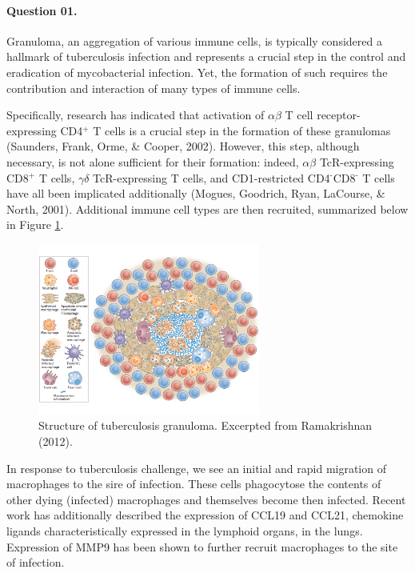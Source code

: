 \documentclass[11pt,letterpaper,final] {article}
\newcommand{\super}[1]{\ensuremath{^{\text{#1}}}}
\begin{document}

\paragraph{Question 01.} Granuloma, an aggregation of various immune cells, is typically considered a hallmark of tuberculosis infection and represents a crucial step in the control and eradication of mycobacterial infection. Yet, the formation of such requires the contribution and interaction of many types of immune cells.

Specifically, research has indicated that activation of $\alpha\beta$ T cell receptor-expressing CD4\super{+} T cells is a crucial step in the formation of these granulomas (Saunders, Frank, Orme, \& Cooper, 2002). However, this step, although necessary, is not alone sufficient for their formation: indeed, $\alpha\beta$ TcR-expressing CD8\super{+} T cells, $\gamma\delta$ TcR-expressing T cells, and CD1-restricted CD4\super{-}CD8\super{-} T cells have all been implicated additionally (Mogues, Goodrich, Ryan, LaCourse, \& North, 2001). Additional immune cell types are then recruited, summarized below in Figure \ref{fig:00}.

\begin{figure}[htp]
  \centering
    \includegraphics[width=0.65\textwidth]{granuloma}
	\caption{Structure of tuberculosis granuloma. Excerpted from Ramakrishnan (2012).}
	\label{fig:00}
\end{figure}

In response to tuberculosis challenge, we see an initial and rapid migration of macrophages to the sire of infection. These cells phagocytose the contents of other dying (infected) macrophages and themselves become then infected. Recent work has additionally described the expression of CCL19 and CCL21, chemokine ligands characteristically expressed in the lymphoid organs, in the lungs. Expression of MMP9 has been shown to further recruit macrophages to the site of infection.
\end{document}
